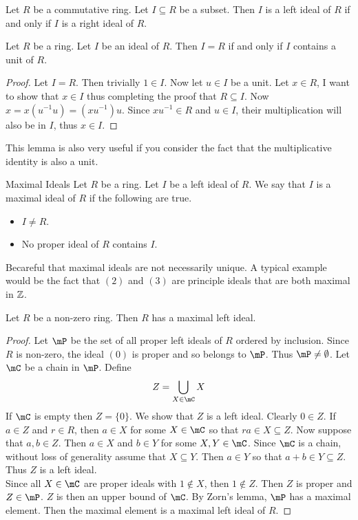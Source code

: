 \documentclass[a4paper]{article}
\begin{document}
\begin{lmm}{}{} Let $R$ be a commutative ring. Let $I\subseteq R$ be a subset. Then $I$ is a left ideal of $R$ if and only if $I$ is a right ideal of $R$. 
\end{lmm}

\begin{lmm}{}{} Let $R$ be a ring. Let $I$ be an ideal of $R$. Then $I=R$ if and only if $I$ contains a unit of $R$. 
\begin{proof}
Let $I=R$. Then trivially $1\in I$. Now let $u\in I$ be a unit. Let $x\in R$, I want to show that $x\in I$ thus completing the proof that $R\subseteq I$. Now $x=x(u^{-1}u)=(xu^{-1})u$. Since $xu^{-1}\in R$ and $u\in I$, their multiplication will also be in $I$, thus $x\in I$. 
\end{proof}
\end{lmm}

This lemma is also very useful if you consider the fact that the multiplicative identity is also a unit. 

\begin{defn}{Maximal Ideals}{} Let $R$ be a ring. Let $I$ be a left ideal of $R$. We say that $I$ is a maximal ideal of $R$ if the following are true. 
\begin{itemize}
\item $I\neq R$. 
\item No proper ideal of $R$ contains $I$. 
\end{itemize}
\end{defn}

Becareful that maximal ideals are not necessarily unique. A typical example would be the fact that $(2)$ and $(3)$ are principle ideals that are both maximal in $\mathbb{Z}$. 

\begin{prp}{}{} Let $R$ be a non-zero ring. Then $R$ has a maximal left ideal. 
\begin{proof}
Let $\mP$ be the set of all proper left ideals of $R$ ordered by inclusion. Since $R$ is non-zero, the ideal $(0)$ is proper and so belongs to $\mP$. Thus $\mP\neq\emptyset$. Let $\mC$ be a chain in $\mP$. Define $$Z=\bigcup_{X\in\mC}X$$ If $\mC$ is empty then $Z=\{0\}$. We show that $Z$ is a left ideal. Clearly $0\in Z$. If $a\in Z$ and $r\in R$, then $a\in X$ for some $X\in\mC$ so that $ra\in X\subseteq Z$. Now suppose that $a,b\in Z$. Then $a\in X$ and $b\in Y$ for some $X,Y\in\mC$. Since $\mC$ is a chain, without loss of generality assume that $X\subseteq Y$. Then $a\in Y$ so that $a+b\in Y\subseteq Z$. Thus $Z$ is a left ideal. \\

Since all $X\in\mC$ are proper ideals with $1\notin X$, then $1\notin Z$. Then $Z$ is proper and $Z\in\mP$. $Z$ is then an upper bound of $\mC$. By Zorn's lemma, $\mP$ has a maximal element. Then the maximal element is a maximal left ideal of $R$. 
\end{proof}
\end{prp}
\end{document}
